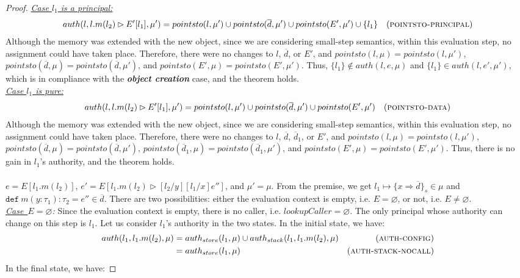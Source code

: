 \documentclass{llncs}
\newcommand{\keywadj}[1]{\mathtt{#1}}
\newcommand{\keyw}[1]{\keywadj{#1}~}
\begin{document}
\begin{proof}
\noindent\textit{\underline{Case $l_1$ is a principal:}}
\begin{align*}
auth(l, l.m(l_2) \rhd E'[l_1], \mu') &= pointsto(l, \mu') \cup pointsto(\overline{d}, \mu') \cup pointsto(E', \mu') \cup \{ l_1 \} & (\textsc{pointsto-principal})
\end{align*}
Although the memory was extended with the new object, since we are considering small-step semantics, within this evaluation step, no assignment could have taken place. Therefore, there were no changes to $l$, $\overline{d}$, or $E'$, and $pointsto(l, \mu) = pointsto(l, \mu')$, $pointsto(\overline{d}, \mu) = pointsto(\overline{d}, \mu')$, and $pointsto(E', \mu) = pointsto(E', \mu')$. Thus, $\{ l_1 \} \not\in auth(l, e, \mu)$ and $\{ l_1 \} \in auth(l, e', \mu')$, which is in compliance with the \textbf{\textit{object creation}} case, and the theorem holds.\\

\noindent\textit{\underline{Case $l_1$ is pure:}}
\begin{align*}
auth(l, l.m(l_2) \rhd E'[l_1], \mu') &= pointsto(l, \mu') \cup pointsto(\overline{d}, \mu') \cup pointsto(E', \mu') & (\textsc{pointsto-data})
\end{align*}
Although the memory was extended with the new object, since we are considering small-step semantics, within this evaluation step, no assignment could have taken place. Therefore, there were no changes to $l$, $\overline{d}$, $\overline{d}_1$, or $E'$, and $pointsto(l, \mu) = pointsto(l, \mu')$, $pointsto(\overline{d}, \mu) = pointsto(\overline{d}, \mu')$, $pointsto(\overline{d}_1, \mu) = pointsto(\overline{d}_1, \mu')$, and $pointsto(E', \mu) = pointsto(E', \mu')$. Thus, there is no gain in $l_1$'s authority, and the theorem holds.\\\\


\noindent{}
$e = E[l_1.m(l_2)]$, $e' = E[l_1.m(l_2) \rhd [l_2/y] [l_1/x] e'']$, and $\mu' = \mu$. From the premise, we get $l_1 \mapsto \{ x \Rightarrow \overline{d} \}_{s} \in \mu$ and $\keyw{def} m(y : \tau_1) : \tau_2 = e'' \in \overline{d}$. There are two possibilities: either the evaluation context is empty, i.e. $E = \varnothing$, or not, i.e. $E \not= \varnothing$.\\

\noindent\textit{\mbox{\underline{Case $E = \varnothing$}}:} Since the evaluation context is empty, there is no caller, i.e. $lookupCaller = \varnothing$. The only principal whose authority can change on this step is $l_1$. Let us consider $l_1$'s authority in the two states. In the initial state, we have:
\begin{align*}
auth(l_1, l_1.m(l_2), \mu) &= auth_{store}(l_1, \mu) \cup auth_{stack}(l_1, l_1.m(l_2), \mu) & (\textsc{auth-config})\\
&= auth_{store}(l_1, \mu) & (\textsc{auth-stack-nocall})
\end{align*}
In the final state, we have:


\end{proof}
\end{document}
